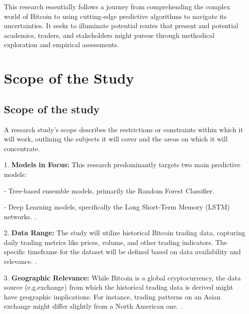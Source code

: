 \smallskip

This research essentially follows a journey from comprehending the complex world of Bitcoin to using cutting-edge predictive algorithms to navigate its uncertainties. It seeks to illuminate potential routes that present and potential academics, traders, and stakeholders might pursue through methodical exploration and empirical assessments.

\goodbreak
\section{Scope of the Study}

\goodbreak
\subsection{Scope of the study}
A research study's scope describes the restrictions or constraints within which it will work, outlining the subjects it will cover and the areas on which it will concentrate.

\smallskip

1. \textbf{Models in Focus: }This research predominantly targets two main predictive models:

\smallskip

-	Tree-based ensemble models, primarily the Random Forest Classifier.

\smallskip

-	Deep Learning models, specifically the Long Short-Term Memory (LSTM) networks. \citep{Goodfellow-et-al-2016}.

\smallskip
2. \textbf{Data Range:} The study will utilize historical Bitcoin trading data, capturing daily trading metrics like prices, volume, and other trading indicators. The specific timeframe for the dataset will be defined based on data availability and relevance. \citep{alma9924678548402466}.

\smallskip

3. \textbf{Geographic Relevance:} While Bitcoin is a global cryptocurrency, the data source (e.g.exchange) from which the historical trading data is derived might have geographic implications. For instance, trading patterns on an Asian exchange might differ slightly from a North American one. \citep{alma9924678548402466}.

